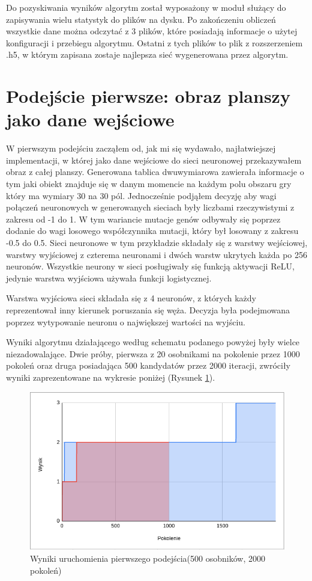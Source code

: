 \documentclass[12pt, oneside, a4paper]{report}
\begin{document}
Do pozyskiwania wyników algorytm został wyposażony w moduł służący do zapisywania wielu statystyk do plików na dysku. Po zakończeniu obliczeń wszystkie dane można odczytać z 3 plików, które posiadają informacje o użytej konfiguracji i przebiegu algorytmu. Ostatni z tych plików to plik z rozszerzeniem .h5, w którym zapisana zostaje najlepsza sieć wygenerowana przez algorytm.

\section{Podejście pierwsze: obraz planszy jako dane wejściowe}

W pierwszym podejściu zacząłem od, jak mi się wydawało, najłatwiejszej implementacji, w której jako dane wejściowe do sieci neuronowej przekazywałem obraz z całej planszy. Generowana tablica dwuwymiarowa zawierała informacje o tym jaki obiekt znajduje się w danym momencie na każdym polu obszaru gry który ma wymiary 30 na 30 pól. Jednocześnie podjąłem decyzję aby wagi połączeń neuronowych w generowanych sieciach były liczbami rzeczywistymi z zakresu od -1 do 1. W tym wariancie mutacje genów odbywały się poprzez dodanie do wagi losowego współczynnika mutacji, który był losowany z zakresu -0.5 do 0.5. Sieci neuronowe w tym przykładzie składały się z warstwy wejściowej, warstwy wyjściowej z czterema neuronami i dwóch warstw ukrytych każda po 256 neuronów. Wszystkie neurony w sieci posługiwały się funkcją aktywacji ReLU, jedynie warstwa wyjściowa używała funkcji logistycznej.

Warstwa wyjściowa sieci składała się z 4 neuronów, z których każdy reprezentował inny kierunek poruszania się węża. Decyzja była podejmowana poprzez wytypowanie neuronu o największej wartości na wyjściu.

Wyniki algorytmu działającego według schematu podanego powyżej były wielce niezadowalające. Dwie próby, pierwsza z 20 osobnikami na pokolenie przez 1000 pokoleń oraz druga posiadająca 500 kandydatów przez 2000 iteracji, zwróciły wyniki zaprezentowane na wykresie poniżej (Rysunek \ref{fig: 4.4.2.2}).

\begin{figure}[h]
	\centering
	\includegraphics[width=13cm]{fig42.png}
	\caption{Wyniki uruchomienia pierwszego podejścia(500 osobników, 2000 pokoleń) }
	\label{fig: 4.4.2.2}
\end{figure}
\end{document}
